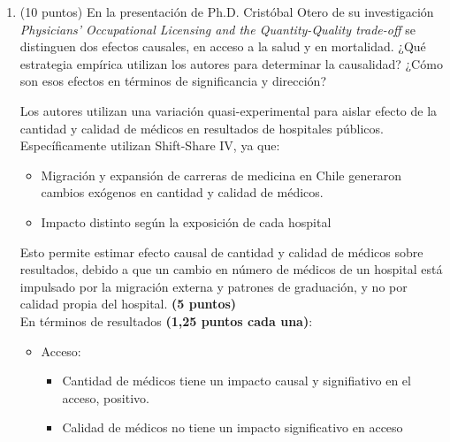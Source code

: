 \documentclass[10pt,a4paper]{article}
\begin{document}
\begin{enumerate}
\begin{enumerate}
{De manera análoga, para $k \geq 1$:
\[
\gamma(k) = \operatorname{Cov}(X_t, X_{t-k})
= \operatorname{Cov}(\phi X_{t-1} + \varepsilon_t,\, X_{t-k})
= \phi\,\operatorname{Cov}(X_{t-1}, X_{t-k})
= \phi\,\gamma(k-1).
\]

Esta relación recursiva implica
\[
\gamma(k) = \phi^k \gamma(0), \qquad k = 0,1,2,\dots
\]
y, por tanto, la \textbf{función de autocorrelación} es
\[
\rho(k) = \frac{\gamma(k)}{\gamma(0)} = \frac{\phi^k \gamma(0)}{\gamma(0)} = \phi^k,
\qquad k = 0,1,2,\dots
\]

Es decir, en un AR(1) estacionario la autocorrelación de orden $k$ decae geométricamente como $\phi^k$.

No es necesario todo el calculo solo explicar porque la correlación con el  primer rezago es 0.8 y luego decrece. (3 puntos)
}
\end{enumerate}

    \item (10 puntos) En la presentación de Ph.D. Cristóbal Otero de su investigación \textit{Physicians’ Occupational Licensing and the Quantity-Quality trade-off} se distinguen dos efectos causales, en acceso a la salud y en mortalidad. ¿Qué estrategia empírica utilizan los autores para determinar la causalidad? ¿Cómo son esos efectos en términos de significancia y dirección?\\

    {\color{blue} 
    Los autores utilizan una variación quasi-experimental para aislar efecto de la cantidad y calidad de médicos en resultados de hospitales públicos. Específicamente utilizan Shift-Share IV, ya que:
    \begin{itemize}
        \item Migración y expansión de carreras de medicina en Chile generaron cambios exógenos en cantidad y calidad de médicos.
        \item Impacto distinto según la exposición de cada hospital
    \end{itemize}
    
    Esto permite estimar efecto causal de cantidad y calidad de médicos sobre resultados, debido a que un cambio en número de médicos de un hospital está impulsado por la migración externa y patrones de graduación, y no por calidad propia del hospital. \textbf{(5 puntos)}\\

    En términos de resultados \textbf{(1,25 puntos cada una)}:
    \begin{itemize}
        \item Acceso:
        \begin{itemize}
            \item Cantidad de médicos tiene un impacto causal y signifiativo en el acceso, positivo.
            \item Calidad de médicos no tiene un impacto significativo en acceso
        \end{itemize}
        

\end{itemize}}
\end{enumerate}
\end{document}
